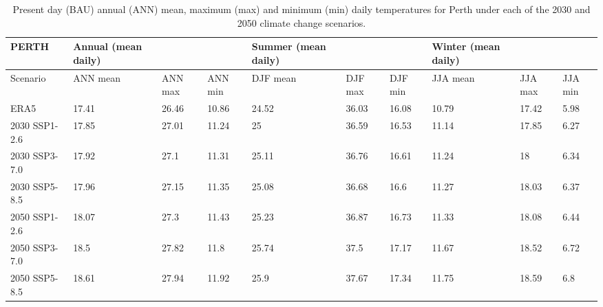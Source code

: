 \documentclass[utf8]{frontiersSCNS} %
\begin{document}
\setlength\arrayrulewidth{1pt} %
\begin{table}[!ht]\caption{Present day (BAU) annual (ANN) mean, maximum (max) and minimum (min) daily temperatures for Perth under each of the 2030 and 2050 climate change scenarios.}
    \centering
    \small
    \begin{tabular}{|l|p{1.5cm}|p{1.1cm}|p{1.1cm}|p{1.5cm}|p{1.1cm}|p{1.1cm}|p{1.5cm}|p{1.1cm}|p{1.1cm}|}
    \hline
        PERTH & Annual (mean daily) \cellcolor{light-gray}& ~ \cellcolor{light-gray}& ~\cellcolor{light-gray}& Summer (mean daily)\cellcolor{yellow!25}& ~\cellcolor{yellow!25} & ~\cellcolor{yellow!25} & Winter (mean daily)  \cellcolor{light-blue!25} & ~ \cellcolor{light-blue!25}& ~ \cellcolor{light-blue!25}\\ \hline

  Scenario & ANN mean \cellcolor{light-gray}& ANN max \cellcolor{light-gray}& ANN min\cellcolor{light-gray} & DJF mean\cellcolor{yellow!25} & DJF max\cellcolor{yellow!25} & DJF min\cellcolor{yellow!25} & JJA mean \cellcolor{light-blue!25}& JJA max \cellcolor{light-blue!25}& JJA min \cellcolor{light-blue!25}\\ \hline
        ERA5 & 17.41 & 26.46 & 10.86 & 24.52 & 36.03 & 16.08 & 10.79 & 17.42 & 5.98 \\ \hline
        2030 SSP1-2.6 & 17.85 & 27.01 & 11.24 & 25 & 36.59 & 16.53 & 11.14 & 17.85 & 6.27 \\ \hline
        2030 SSP3-7.0 & 17.92 & 27.1 & 11.31 & 25.11 & 36.76 & 16.61 & 11.24 & 18 & 6.34 \\ \hline
        2030 SSP5-8.5 & 17.96 & 27.15 & 11.35 & 25.08 & 36.68 & 16.6 & 11.27 & 18.03 & 6.37 \\ \hline
        2050 SSP1-2.6 & 18.07 & 27.3 & 11.43 & 25.23 & 36.87 & 16.73 & 11.33 & 18.08 & 6.44 \\ \hline
        \rowcolor{light-green!25}2050 SSP3-7.0 & 18.5 & 27.82 & 11.8 & 25.74 & 37.5 & 17.17 & 11.67 & 18.52 & 6.72 \\ \hline
        2050 SSP5-8.5 & 18.61 & 27.94 & 11.92 & 25.9 & 37.67 & 17.34 & 11.75 & 18.59 & 6.8 \\ \hline
    \end{tabular}\label{table:perth}
\end{table}
\setlength\arrayrulewidth{0.4pt} %
\end{document}
